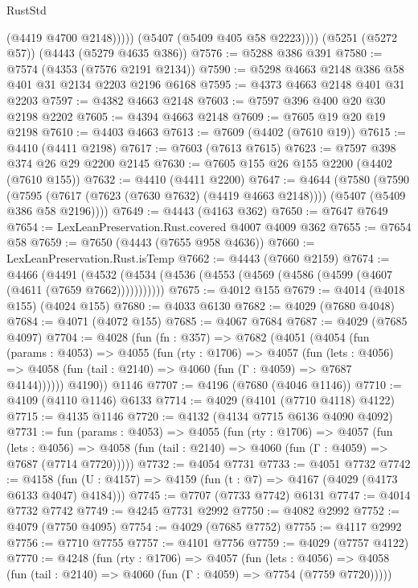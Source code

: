 \begin{lexlean}{RustStd}
\begin{coremodule}
                (@4419 @4700 @2148)))))
        (@5407 (@5409 @405 @58 @2223))))
    (@5251 (@5272 @57))
    (@4443 (@5279 @4635 @386))
@7576 := @5288 @386 @391
@7580 := @7574 (@4353 (@7576 @2191 @2134))
@7590 := @5298 @4663 @2148 @386 @58 @401 @31 @2134 @2203 @2196 @6168
@7595 := @4373 @4663 @2148 @401 @31 @2203
@7597 := @4382 @4663 @2148
@7603 := @7597 @396 @400 @20 @30 @2198 @2202
@7605 := @4394 @4663 @2148
@7609 := @7605 @19 @20 @19 @2198
@7610 := @4403 @4663
@7613 := @7609 (@4402 (@7610 @19))
@7615 := @4410 (@4411 @2198)
@7617 := @7603 (@7613 @7615)
@7623 := @7597 @398 @374 @26 @29 @2200 @2145
@7630 := @7605 @155 @26 @155 @2200 (@4402 (@7610 @155))
@7632 := @4410 (@4411 @2200)
@7647 := @4644
    (@7580
      (@7590
        (@7595 (@7617 (@7623 (@7630 @7632) (@4419 @4663 @2148))))
        (@5407 (@5409 @386 @58 @2196))))
@7649 := @4443 (@4163 @362)
@7650 := @7647 @7649
@7654 := LexLeanPreservation.Rust.covered @4007 @4009 @362
@7655 := @7654 @58
@7659 := @7650 (@4443 (@7655 @958 @4636))
@7660 := LexLeanPreservation.Rust.isTemp
@7662 := @4443 (@7660 @2159)
@7674 := @4466
    (@4491 (@4532 (@4534 (@4536 (@4553 (@4569 (@4586 (@4599 (@4607 (@4611 (@7659 @7662)))))))))))
@7675 := @4012 @155
@7679 := @4014 (@4018 @155) (@4024 @155)
@7680 := @4033 @6130
@7682 := @4029 (@7680 @4048)
@7684 := @4071 (@4072 @155)
@7685 := @4067 @7684
@7687 := @4029 (@7685 @4097)
@7704 := @4028
    (fun (fn : @357) =>
    @7682
      (@4051
        (@4054
          (fun (params : @4053) =>
          @4055
            (fun (rty : @1706) =>
            @4057
              (fun (lets : @4056) =>
              @4058 (fun (tail : @2140) => @4060 (fun (Γ : @4059) => @7687 @4144))))))
        @4190))
    @1146
@7707 := @4196 (@7680 (@4046 @1146))
@7710 := @4109 (@4110 @1146) @6133
@7714 := @4029 (@4101 (@7710 @4118) @4122)
@7715 := @4135 @1146
@7720 := @4132 (@4134 @7715 @6136 @4090 @4092)
@7731 := fun (params : @4053) =>
  @4055
    (fun (rty : @1706) =>
    @4057
      (fun (lets : @4056) =>
      @4058 (fun (tail : @2140) => @4060 (fun (Γ : @4059) => @7687 (@7714 @7720)))))
@7732 := @4054 @7731
@7733 := @4051 @7732
@7742 := @4158 (fun (U : @4157) => @4159 (fun (t : @7) => @4167 (@4029 (@4173 @6133 @4047) @4184)))
@7745 := @7707 (@7733 @7742) @6131
@7747 := @4014 @7732 @7742
@7749 := @4245 @7731 @2992
@7750 := @4082 @2992
@7752 := @4079 (@7750 @4095)
@7754 := @4029 (@7685 @7752)
@7755 := @4117 @2992
@7756 := @7710 @7755
@7757 := @4101 @7756
@7759 := @4029 (@7757 @4122)
@7770 := @4248
    (fun (rty : @1706) =>
    @4057
      (fun (lets : @4056) =>
      @4058 (fun (tail : @2140) => @4060 (fun (Γ : @4059) => @7754 (@7759 @7720)))))

\end{coremodule}
\end{lexlean}
